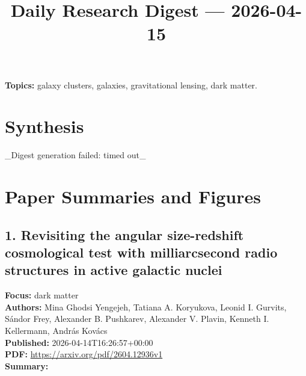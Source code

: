 \documentclass[11pt]{article}
\begin{document}
\title{Daily Research Digest --- 2026-04-15}
\author{}
\date{}
\maketitle
\textbf{Topics:} galaxy clusters, galaxies, gravitational lensing, dark matter.
\section*{Synthesis}
\_Digest generation failed: timed out\_
\newpage
\section*{Paper Summaries and Figures}
\subsection*{1. Revisiting the angular size-redshift cosmological test with milliarcsecond radio structures in active galactic nuclei}
\textbf{Focus:} dark matter\\
\textbf{Authors:} Mina Ghodsi Yengejeh, Tatiana A. Koryukova, Leonid I. Gurvits, Sándor Frey, Alexander B. Pushkarev, Alexander V. Plavin, Kenneth I. Kellermann, András Kovács\\
\textbf{Published:} 2026-04-14T16:26:57+00:00\\
\textbf{PDF:} \href{https://arxiv.org/pdf/2604.12936v1}{https://arxiv.org/pdf/2604.12936v1}\\
\textbf{Summary:}
\end{document}
